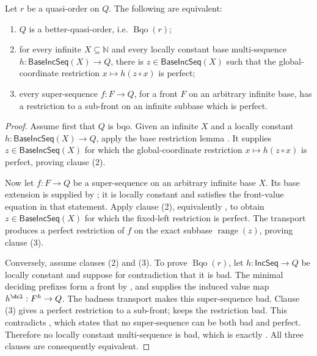\begin{corollary}\label{lem:subarr}
Let $r$ be a quasi-order on $Q$.  The following are equivalent:
\begin{enumerate}
\item $Q$ is a better-quasi-order, i.e. $\operatorname{Bqo}(r)$;
\item for every infinite $X\subseteq\mathbb N$ and every locally constant
      base multi-sequence $h:\mathsf{BaseIncSeq}(X)\to Q$, there is
      $z\in\mathsf{BaseIncSeq}(X)$ such that the global-coordinate
      restriction $x\mapsto h(z\circ x)$ is perfect;
\item every super-sequence $f:F\to Q$, for a front $F$ on an arbitrary
      infinite base, has a restriction to a sub-front on an infinite
      subbase which is perfect.
\end{enumerate}
\end{corollary}
\begin{proof}
Assume first that $Q$ is bqo.  Given an infinite $X$ and a locally constant
$h:\mathsf{BaseIncSeq}(X)\to Q$, apply the base restriction lemma
.  It supplies
$z\in\mathsf{BaseIncSeq}(X)$ for which the global-coordinate restriction
$x\mapsto h(z\circ x)$ is perfect, proving clause (2).

Now let $f:F\to Q$ be a super-sequence on an arbitrary infinite base $X$.
Its base extension is supplied by ; it is
locally constant and satisfies the front-value equation in that statement.
Apply clause (2), equivalently , to obtain
$z\in\mathsf{BaseIncSeq}(X)$ for which the fixed-left restriction is
perfect.  The transport  produces a perfect
restriction of $f$ on the exact subbase $\operatorname{range}(z)$, proving
clause (3).

Conversely, assume clauses (2) and (3).  To prove $\operatorname{Bqo}(r)$,
let $h:\mathsf{IncSeq}\to Q$ be locally constant and suppose for
contradiction that it is bad.  The minimal deciding prefixes form a front
by , and  supplies the
induced value map $h^{\dcl}:F^h\to Q$.  The badness transport
 makes this super-sequence bad.  Clause (3) gives
a perfect restriction to a sub-front;  keeps the
restriction bad.  This contradicts , which
states that no super-sequence can be both bad and perfect.  Therefore no
locally constant multi-sequence is bad, which is exactly .
All three clauses are consequently equivalent.
\end{proof}
